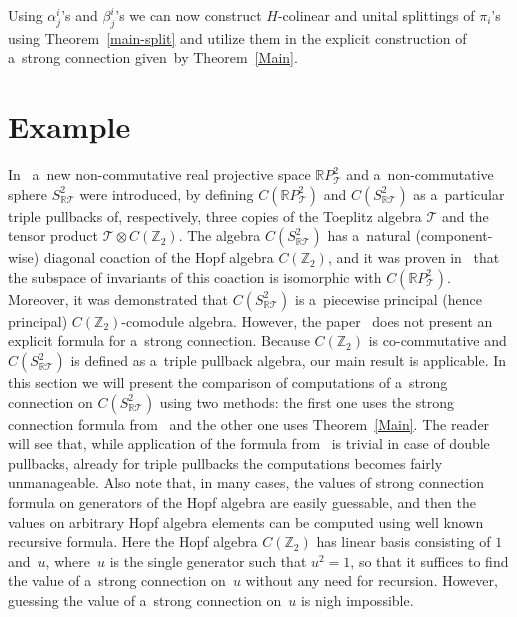 \documentclass[pdftex]{sigma}
\newcommand{\qcp}[1]{{C(\mathbb{R} P^{#1}_\mathcal{T})}}
\begin{document}
Using $\alpha^i_j$'s and $\beta^i_j$'s we can now construct $H$-colinear and unital splittings of $\pi_i$'s using
Theo\-rem~\ref{main-split} and utilize them in the explicit construction of a~strong connection given~by
Theorem~\ref{Main}.

\section{Example}\label{example-section}

In~\cite{reduct} a~new non-commutative real projective space $\mathbb{R} P^{2}_{\mathcal{T}}$ and a~non-commutative
sphere $S^2_{\mathbb{R}\mathcal{T}}$ were introduced, by def\/ining $\qcp 2$ and ${C(S^2_{\mathbb{R}\mathcal{T}})}$ as
a~particular triple pullbacks of, respectively, three copies of the Toeplitz algebra ${\mathcal{T}}$ and the tensor
product ${\mathcal{T}}\otimes C({\mathbb Z_2})$.
The algebra ${C(S^2_{\mathbb{R}\mathcal{T}})}$ has a~natural (component-wise) diagonal coaction of the Hopf algebra
$C({\mathbb Z_2})$, and it was proven in~\cite{reduct} that the subspace of invariants of this coaction is isomorphic
with $\qcp 2$.
Moreover, it was demonstrated that ${C(S^2_{\mathbb{R}\mathcal{T}})}$ is a~piecewise principal (hence principal)
$C({\mathbb Z_2})$-comodule algebra.
However, the paper~\cite{reduct} does not present an explicit formula for a~strong connection.
Because $C({\mathbb Z_2})$ is co-commutative and ${C(S^2_{\mathbb{R}\mathcal{T}})}$ is def\/ined as a~triple pullback
algebra, our main result is applicable.
In this section we will present the comparison of computations of a~strong connection on
${C(S^2_{\mathbb{R}\mathcal{T}})}$ using two methods: the f\/irst one uses the strong connection formula
from~\cite{hkmz11} and the other one uses Theorem~\ref{Main}.
The reader will see that, while application of the formula from~\cite{hkmz11} is trivial in case of double pullbacks,
already for triple pullbacks the computations becomes fairly unmanageable.
Also note that, in many cases, the values of strong connection formula on generators of the Hopf algebra are easily
guessable, and then the values on arbitrary Hopf algebra elements can be computed using well known recursive formula.
Here the Hopf algebra $C({\mathbb Z_2})$ has linear basis consisting of $1$ and~$u$, where~$u$ is the single generator
such that $u^2=1$, so that it suf\/f\/ices to f\/ind the value of a~strong connection on~$u$ without any need for recursion.
However, guessing the value of a~strong connection on~$u$ is nigh impossible.
\end{document}
